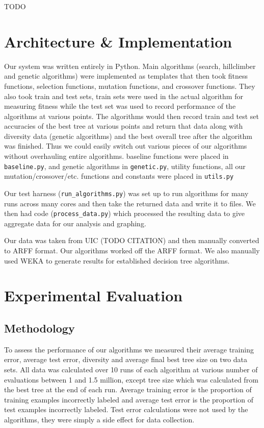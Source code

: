\documentclass{acm_proc_article-sp}
\begin{document}
TODO

\section{Architecture \& Implementation}

Our system was written entirely in Python. Main algorithms (search, hillclimber and genetic algorithms) were implemented as templates that then took fitness functions, selection functions, mutation functions, and crossover functions. They also took train and test sets, train sets were used in the actual algorithm for measuring fitness while the test set was used to record performance of the algorithms at various points. The algorithms would then record train and test set accuracies of the best tree at various points and return that data along with diversity data (genetic algorithms) and the best overall tree after the algorithm was finished. Thus we could easily switch out various pieces of our algorithms without overhauling entire algorithms. baseline functions were placed in \texttt{baseline.py}, and genetic algorithms in \texttt{genetic.py}, utility functions, all our mutation/crossover/etc. functions and constants were placed in \texttt{utils.py}

Our test harness (\texttt{run\_algorithms.py}) was set up to run algorithms for many runs across many cores and then take the returned data and write it to files. We then had code (\texttt{process\_data.py}) which processed the resulting data to give aggregate data for our analysis and graphing.

Our data was taken from UIC (TODO CITATION) and then manually converted to ARFF format. Our algorithms worked off the ARFF format. We also manually used WEKA to generate results for established decision tree algorithms.

\section{Experimental Evaluation}

\subsection{Methodology}

To assess the performance of our algorithms we measured their average training error, average test error, diversity and average final best tree size on two data sets. All data was calculated over 10 runs of each algorithm at various number of evaluations between 1 and 1.5 million, except tree size which was calculated from the best tree at the end of each run. Average training error is the proportion of training examples incorrectly labeled and average test error is the proportion of test examples incorrectly labeled. Test error calculations were not used by the algorithms, they were simply a side effect for data collection.
\end{document}
